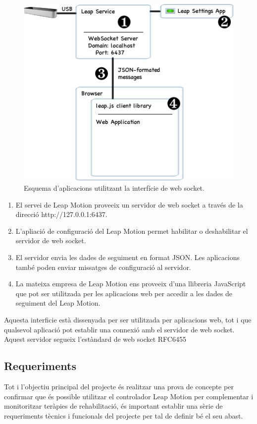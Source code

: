 \documentclass[12pt,a4paper,catalan]{article}
\begin{document}
	\begin{figure}[H]
		\includegraphics[width=\textwidth,keepaspectratio]{websocket-interface.png}
		\centering
		\caption{Esquema d'aplicacions utilitzant la interfície de web socket.}
	\end{figure}
	
	\begin{enumerate}
		\item El servei de Leap Motion proveeix un servidor de web socket a través de la direcció http://127.0.0.1:6437.
		\item L'apliació de configuració del Leap Motion permet habilitar o deshabilitar el servidor de web socket.
		\item El servidor envia les dades de seguiment en format JSON. Les aplicacions també poden enviar missatges de configuració al servidor.
		\item La mateixa empresa de Leap Motion ens proveeix d'una llibreria JavaScript que pot ser utilitzada per les aplicacions web per accedir a les dades de seguiment del Leap Motion.
	\end{enumerate}
	
	Aquesta interficie està dissenyada per ser utilitzada per aplicacions web, tot i que qualsevol aplicació pot establir una connexió amb el servidor de web socket. Aquest servidor segueix l'estàndard de web socket RFC6455

	\subsection{Requeriments}
	Tot i l'objectiu principal del projecte és realitzar una prova de concepte per confirmar que és possible utilitzar el controlador Leap Motion per complementar i monitoritzar teràpies de rehabilitació, és important establir una sèrie de requeriments tècnics i funcionals del projecte per tal de definir bé el seu abast.
\end{document}
